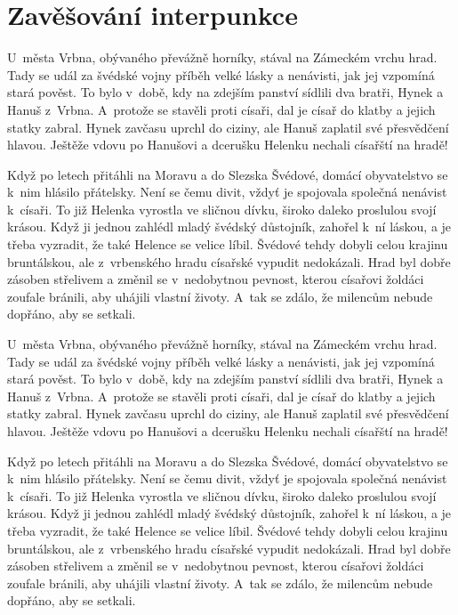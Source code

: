 \documentclass{article}
\begin{document}
  \newpage
  \section{Zavěšování interpunkce}
  \begin{multicols}{2}
    U~města Vrbna, obývaného převážně horníky, stával na Zámeckém vrchu hrad.
    Tady se udál za švédské vojny příběh velké lásky a nenávisti, jak jej
    vzpomíná stará pověst.  To bylo v~době, kdy na zdejším panství sídlili dva
    bratři, Hynek a Hanuš z~Vrbna. A~protože se stavěli proti císaři, dal je
    císař do klatby a jejich statky zabral. Hynek zavčasu uprchl do ciziny, ale
    Hanuš zaplatil své přesvědčení hlavou. Ještěže vdovu po Hanušovi a dcerušku
    Helenku nechali císařští na hradě!

    Když po letech přitáhli na Moravu a do Slezska Švédové, domácí obyvatelstvo
    se k~nim hlásilo přátelsky. Není se čemu divit, vždyť je spojovala společná
    nenávist k~císaři. To již Helenka vyrostla ve sličnou dívku, široko daleko
    proslulou svojí krásou. Když ji jednou zahlédl mladý švédský důstojník,
    zahořel k~ní láskou, a je třeba vyzradit, že také Helence se velice líbil.
    Švédové tehdy dobyli celou krajinu bruntálskou, ale z~vrbenského hradu
    císařské vypudit nedokázali. Hrad byl dobře zásoben střelivem a změnil se
    v~nedobytnou pevnost, kterou císařovi žoldáci zoufale bránili, aby uhájili
    vlastní životy. A~tak se zdálo, že milencům nebude dopřáno, aby se setkali.
    \columnbreak

    U~města Vrbna, obývaného převážně horníky, stával na Zámeckém vrchu hrad.
    Tady se udál za švédské vojny příběh velké lásky a nenávisti, jak jej
    vzpomíná stará pověst.  To bylo v~době, kdy na zdejším panství sídlili dva
    bratři, Hynek a Hanuš z~Vrbna. A~protože se stavěli proti císaři, dal je
    císař do klatby a jejich statky zabral. Hynek zavčasu uprchl do ciziny, ale
    Hanuš zaplatil své přesvědčení hlavou. Ještěže vdovu po Hanušovi a dcerušku
    Helenku nechali císařští na hradě!

    Když po letech přitáhli na Moravu a do Slezska Švédové, domácí obyvatelstvo
    se k~nim hlásilo přátelsky. Není se čemu divit, vždyť je spojovala společná
    nenávist k~císaři. To již Helenka vyrostla ve sličnou dívku, široko daleko
    proslulou svojí krásou. Když ji jednou zahlédl mladý švédský důstojník,
    zahořel k~ní láskou, a je třeba vyzradit, že také Helence se velice líbil.
    Švédové tehdy dobyli celou krajinu bruntálskou, ale z~vrbenského hradu
    císařské vypudit nedokázali. Hrad byl dobře zásoben střelivem a změnil se
    v~nedobytnou pevnost, kterou císařovi žoldáci zoufale bránili, aby uhájili
    vlastní životy. A~tak se zdálo, že milencům nebude dopřáno, aby se setkali.
  \end{multicols}
\end{document}
